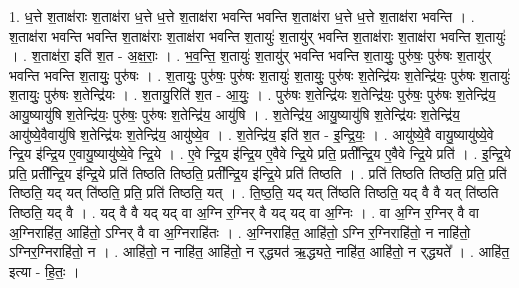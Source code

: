 \documentclass[17pt]{extarticle}
\begin{document}
1. ध॒त्ते श॒ताक्ष॑राः श॒ताक्ष॑रा ध॒त्ते ध॒त्ते श॒ताक्ष॑रा भवन्ति भवन्ति श॒ताक्ष॑रा ध॒त्ते ध॒त्ते श॒ताक्ष॑रा भवन्ति । . श॒ताक्ष॑रा भवन्ति भवन्ति श॒ताक्ष॑राः श॒ताक्ष॑रा भवन्ति श॒तायुः॑ श॒तायु॑र् भवन्ति श॒ताक्ष॑राः श॒ताक्ष॑रा भवन्ति श॒तायुः॑ । . श॒ताक्ष॑रा॒ इति॑ श॒त - अ॒क्ष॒राः॒ । . भ॒व॒न्ति॒ श॒तायुः॑ श॒तायु॑र् भवन्ति भवन्ति श॒तायुः॒ पुरु॑षः॒ पुरु॑षः श॒तायु॑र् भवन्ति भवन्ति श॒तायुः॒ पुरु॑षः । . श॒तायुः॒ पुरु॑षः॒ पुरु॑षः श॒तायुः॑ श॒तायुः॒ पुरु॑षः श॒तेन्द्रि॑यः श॒तेन्द्रि॑यः॒ पुरु॑षः श॒तायुः॑ श॒तायुः॒ पुरु॑षः श॒तेन्द्रि॑यः । . श॒तायु॒रिति॑ श॒त - आ॒युः॒ । . पुरु॑षः श॒तेन्द्रि॑यः श॒तेन्द्रि॑यः॒ पुरु॑षः॒ पुरु॑षः श॒तेन्द्रि॑य॒ आयु॒ष्यायु॑षि श॒तेन्द्रि॑यः॒ पुरु॑षः॒ पुरु॑षः श॒तेन्द्रि॑य॒ आयु॑षि । . श॒तेन्द्रि॑य॒ आयु॒ष्यायु॑षि श॒तेन्द्रि॑यः श॒तेन्द्रि॑य॒ आयु॑ष्ये॒वैवायु॑षि श॒तेन्द्रि॑यः श॒तेन्द्रि॑य॒ आयु॑ष्ये॒व । . श॒तेन्द्रि॑य॒ इति॑ श॒त - इ॒न्द्रि॒यः॒ । . आयु॑ष्ये॒वै वायु॒ष्यायु॑ष्ये॒वे न्द्रि॒य इ॑न्द्रि॒य ए॒वायु॒ष्यायु॑ष्ये॒वे न्द्रि॒ये । . ए॒वे न्द्रि॒य इ॑न्द्रि॒य ए॒वैवे न्द्रि॒ये प्रति॒ प्रती᳚न्द्रि॒य ए॒वैवे न्द्रि॒ये प्रति॑ । . इ॒न्द्रि॒ये प्रति॒ प्रती᳚न्द्रि॒य इ॑न्द्रि॒ये प्रति॑ तिष्ठति तिष्ठति॒ प्रती᳚न्द्रि॒य इ॑न्द्रि॒ये प्रति॑ तिष्ठति । . प्रति॑ तिष्ठति तिष्ठति॒ प्रति॒ प्रति॑ तिष्ठति॒ यद् यत् ति॑ष्ठति॒ प्रति॒ प्रति॑ तिष्ठति॒ यत् । . ति॒ष्ठ॒ति॒ यद् यत् ति॑ष्ठति तिष्ठति॒ यद् वै वै यत् ति॑ष्ठति तिष्ठति॒ यद् वै । . यद् वै वै यद् यद् वा अ॒ग्नि र॒ग्निर् वै यद् यद् वा अ॒ग्निः । . वा अ॒ग्नि र॒ग्निर् वै वा अ॒ग्निराहि॑त॒ आहि॑तो॒ ऽग्निर् वै वा अ॒ग्निराहि॑तः । . अ॒ग्निराहि॑त॒ आहि॑तो॒ ऽग्नि र॒ग्निराहि॑तो॒ न नाहि॑तो॒ ऽग्निर॒ग्निराहि॑तो॒ न । . आहि॑तो॒ न नाहि॑त॒ आहि॑तो॒ न र्‌द्ध्यत॑ ऋ॒द्ध्यते॒ नाहि॑त॒ आहि॑तो॒ न र्‌द्ध्यते᳚ । . आहि॑त॒ इत्या - हि॒तः॒ । \newline
\end{document}
